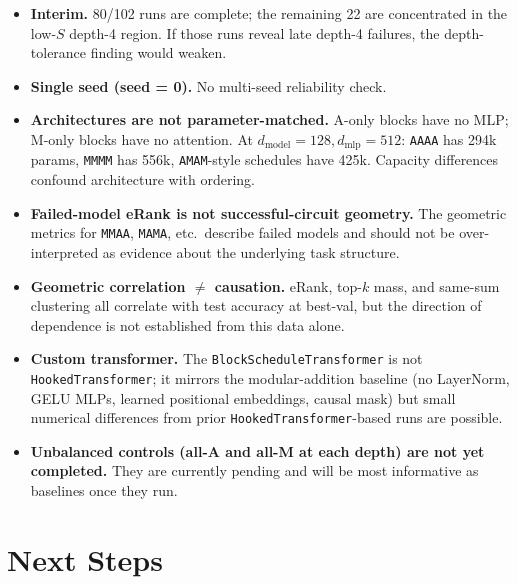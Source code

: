 \documentclass[10pt]{article}
\begin{document}
\begin{itemize}
\item \textbf{Interim.} 80/102 runs are complete; the remaining 22 are concentrated in the low-$S$ depth-4 region. If those runs reveal late depth-4 failures, the depth-tolerance finding would weaken.

\item \textbf{Single seed (seed = 0).} No multi-seed reliability check.

\item \textbf{Architectures are not parameter-matched.} A-only blocks have no MLP; M-only blocks have no attention. At $d_\text{model}=128, d_\text{mlp}=512$: \texttt{AAAA} has 294k params, \texttt{MMMM} has 556k, \texttt{AMAM}-style schedules have 425k. Capacity differences confound architecture with ordering.

\item \textbf{Failed-model eRank is not successful-circuit geometry.} The geometric metrics for \texttt{MMAA}, \texttt{MAMA}, etc.\ describe failed models and should not be over-interpreted as evidence about the underlying task structure.

\item \textbf{Geometric correlation $\neq$ causation.} eRank, top-$k$ mass, and same-sum clustering all correlate with test accuracy at best-val, but the direction of dependence is not established from this data alone.

\item \textbf{Custom transformer.} The \texttt{BlockScheduleTransformer} is not \texttt{HookedTransformer}; it mirrors the modular-addition baseline (no LayerNorm, GELU MLPs, learned positional embeddings, causal mask) but small numerical differences from prior \texttt{HookedTransformer}-based runs are possible.

\item \textbf{Unbalanced controls (all-A and all-M at each depth) are not yet completed.} They are currently pending and will be most informative as baselines once they run.
\end{itemize}

\section{Next Steps}
\end{document}
